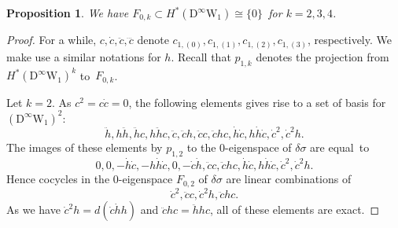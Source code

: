 \documentclass[12pt]{amsart}
\newcommand{\W}{\mathrm{W}}
\newcommand{\D}{\mathrm{D}}
\newtheorem{proposition}[theorem]{Proposition}
\theoremstyle{definition}
\theoremstyle{remark}
\begin{document}
\begin{proposition}
\label{prop10.6}
We have $F_{0,k}\subset H^*(\D^\infty\W_1)\cong\{0\}$\, for $k=2,3,4$.
\end{proposition}
\begin{proof}
For a while, $c,\dot{c},\ddot{c},\dddot{c}$ denote $c_{1,(0)},c_{1,(1)},c_{1,(2)},c_{1,(3)}$, respectively.
We make use a similar notations for $h$.
Recall that $p_{1,k}$ denotes the projection from $H^*(\D^\infty\W_1)^k$ to~$F_{0,k}$.

Let $k=2$.
As $c^2=c\dot{c}=0$, the following elements gives rise to a set of basis for $(\D^\infty\W_1)^2$:
\[
\ddot{h}, h\ddot{h}, \ddot{h}c, h\ddot{h}c,%
\ddot{c}, \ddot{c}h, \ddot{c}c, \ddot{c}hc,%
\dot{h}\dot{c}, h\dot{h}\dot{c},%
\dot{c}^2, \dot{c}^2h.
\]
The images of these elements by $p_{1,2}$ to the $0$-eigenspace of $\delta\sigma$ are equal~to
\[
0, 0, -\dot{h}\dot{c},-h\dot{h}\dot{c},%
0, -\dot{c}\dot{h}, \ddot{c}c, \ddot{c}hc,%
\dot{h}\dot{c},h\dot{h}\dot{c},%
\dot{c}^2,\dot{c}^2h.
\]
Hence cocycles in the $0$-eigenspace $F_{0,2}$ of $\delta\sigma$ are linear combinations of
\[
\dot{c}^2,\ddot{c}c,\dot{c}^2h,\ddot{c}hc.
\]
As we have $\dot{c}^2h=d(\dot{c}\dot{h}h)$ and $\ddot{c}hc=\ddot{h}hc$, all of these elements are exact.


\end{proof}
\end{document}
